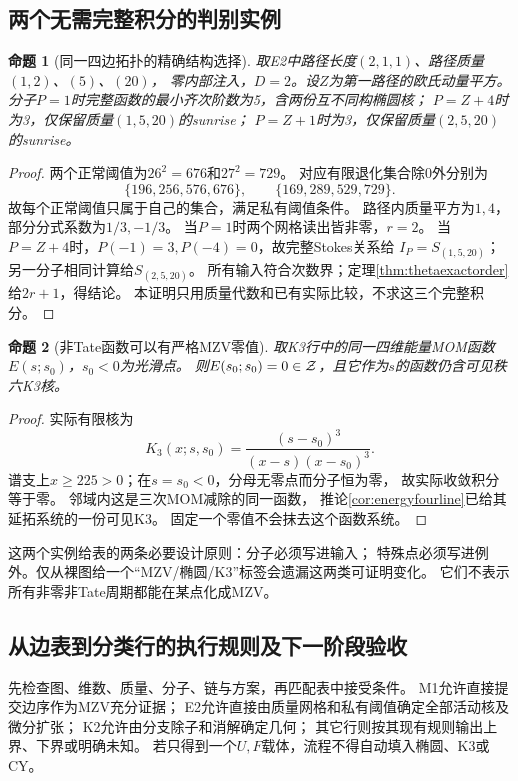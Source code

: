\documentclass[11pt,a4paper]{ctexart}
\theoremstyle{cnplain}\newtheorem{theorem}{定理}[section]
\newtheorem{proposition}[theorem]{命题}
\theoremstyle{definition}\newtheorem{definition}[theorem]{定义}
\theoremstyle{remark}\newtheorem{remark}[theorem]{注}
\begin{document}
\subsection{两个无需完整积分的判别实例}
\label{subsec:classworked}
\begin{proposition}[同一四边拓扑的精确结构选择]\label{prop:classthetaselector}
取E2中路径长度$(2,1,1)$、路径质量$(1,2)$、$(5)$、$(20)$，
零内部注入，$D=2$。设$Z$为第一路径的欧氏动量平方。
分子$P=1$时完整函数的最小齐次阶数为5，含两份互不同构椭圆核；
$P=Z+4$时为3，仅保留质量$(1,5,20)$的sunrise；
$P=Z+1$时为3，仅保留质量$(2,5,20)$的sunrise。
\end{proposition}
\begin{proof}
两个正常阈值为$26^2=676$和$27^2=729$。
对应有限退化集合除$0$外分别为
\[
 \{196,256,576,676\},\qquad\{169,289,529,729\}.
\]
故每个正常阈值只属于自己的集合，满足私有阈值条件。
路径内质量平方为$1,4$，部分分式系数为$1/3,-1/3$。
当$P=1$时两个网格读出皆非零，$r=2$。
当$P=Z+4$时，$P(-1)=3,P(-4)=0$，故完整Stokes关系给
$I_P=S_{(1,5,20)}$；另一分子相同计算给$S_{(2,5,20)}$。
所有输入符合次数界；定理\ref{thm:thetaexactorder}给$2r+1$，得结论。
本证明只用质量代数和已有实际比较，不求这三个完整积分。
\end{proof}

\begin{proposition}[非Tate函数可以有严格MZV零值]\label{prop:classmomzero}
取K3行中的同一四维能量MOM函数$E(s;s_0)$，$s_0<0$为光滑点。
则$E(s_0;s_0)=0\in\cal Z$，且它作为$s$的函数仍含可见秩六K3核。
\end{proposition}
\begin{proof}
实际有限核为
\[
 K_3(x;s,s_0)=\frac{(s-s_0)^3}{(x-s)(x-s_0)^3}.
\]
谱支上$x\ge225>0$；在$s=s_0<0$，分母无零点而分子恒为零，
故实际收敛积分等于零。
邻域内这是三次MOM减除的同一函数，
推论\ref{cor:energyfourline}已给其延拓系统的一份可见K3。
固定一个零值不会抹去这个函数系统。
\end{proof}

这两个实例给表的两条必要设计原则：分子必须写进输入；
特殊点必须写进例外。仅从裸图给一个“MZV/椭圆/K3”标签会遗漏这两类可证明变化。
它们不表示所有非零非Tate周期都能在某点化成MZV。

\subsection{从边表到分类行的执行规则及下一阶段验收}
\label{subsec:classprogram}
先检查图、维数、质量、分子、链与方案，再匹配表中接受条件。
M1允许直接提交边序作为MZV充分证据；
E2允许直接由质量网格和私有阈值确定全部活动核及微分扩张；
K2允许由分支除子和消解确定几何；
其它行则按其现有规则输出上界、下界或明确未知。
若只得到一个$U,F$载体，流程不得自动填入椭圆、K3或CY。
\end{document}
